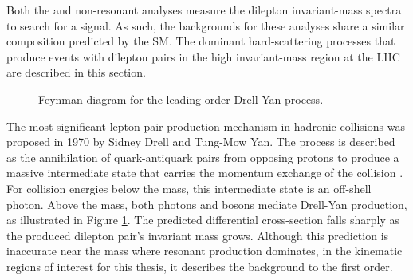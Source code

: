 Both the \hmm and non-resonant analyses measure the dilepton invariant-mass spectra to search for a signal.
As such, the backgrounds for these analyses share a similar composition predicted by the SM.
The dominant hard-scattering processes that produce events with dilepton pairs in the high invariant-mass region at the LHC are described in this section.

\begin{figure}[h!]
\captionsetup[subfigure]{position=b}
\centering
{}
\caption{Feynman diagram for the leading order Drell-Yan process.}
\label{fig:phenoDy}
\end{figure}

The most significant lepton pair production mechanism in hadronic collisions was proposed in 1970 by Sidney Drell and Tung-Mow Yan. 
The process is described as the annihilation of quark-antiquark pairs from opposing protons to produce a massive intermediate state that carries the momentum exchange of the collision \cite{drellYan}.
For collision energies below the \Z mass, this intermediate state is an off-shell photon.
Above the \Z mass, both photons and \Z bosons mediate Drell-Yan production, as illustrated in Figure \ref{fig:phenoDy}.
The predicted differential cross-section falls sharply as the produced dilepton pair's invariant mass grows.
Although this prediction is inaccurate near the \Z mass where resonant production dominates, in the kinematic regions of interest for this thesis, it describes the background to the first order.



